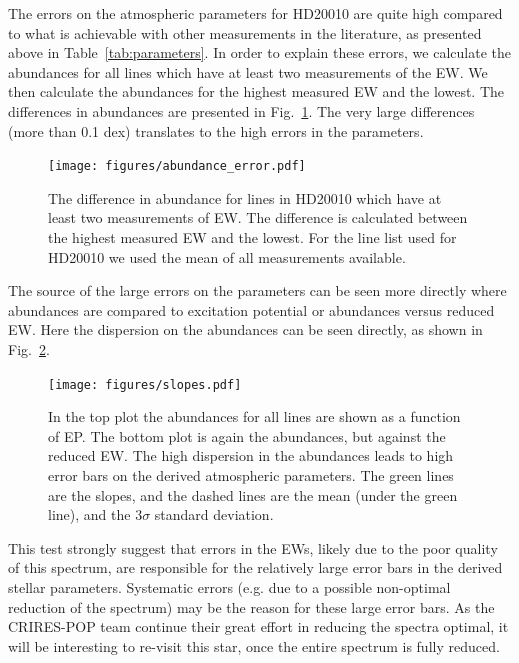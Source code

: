 \documentclass{aa}
\begin{document}
The errors on the atmospheric parameters for HD20010 are quite
high compared to what is achievable with other measurements in the
literature, as presented above in Table~\ref{tab:parameters}. In order
to explain these errors, we calculate the abundances for all lines
which have at least two measurements of the EW. We then calculate the
abundances for the highest measured EW and the lowest. The differences
in abundances are presented in Fig.~\ref{fig:abundance_error}. The very
large differences (more than 0.1 dex) translates to the high errors in
the parameters.

\begin{figure}[tpb!]
    \centering
    \texttt{[image: figures/abundance\_error.pdf]}
    \caption{The difference in abundance for lines in HD20010 which
    have at least two measurements of EW. The difference is calculated
    between the highest measured EW and the lowest. For the line list
    used for HD20010 we used the mean of all measurements available.}
    \label{fig:abundance_error}
\end{figure}

The source of the large errors on the parameters can be seen more
directly where abundances are compared to excitation potential or
abundances versus reduced EW. Here the dispersion on the abundances can
be seen directly, as shown in Fig.~\ref{fig:slopes}.

\begin{figure}[tpb!]
    \centering
    \texttt{[image: figures/slopes.pdf]}
    \caption{In the top plot the  abundances for all
    lines are shown as a function of EP. The bottom plot is again
    the  abundances, but against the reduced EW. The high
    dispersion in the abundances leads to high error bars on the derived
    atmospheric parameters. The green lines are the slopes, and the
    dashed lines are the mean (under the green line), and the $3 \sigma$
    standard deviation.}
    \label{fig:slopes}
\end{figure}

This test strongly suggest that errors in the EWs, likely due to the
poor quality of this spectrum, are responsible for the relatively large
error bars in the derived stellar parameters. Systematic errors (e.g.
due to a possible non-optimal reduction of the spectrum) may be the
reason for these large error bars. As the CRIRES-POP team continue their
great effort in reducing the spectra optimal, it will be interesting to
re-visit this star, once the entire spectrum is fully reduced.
\end{document}
